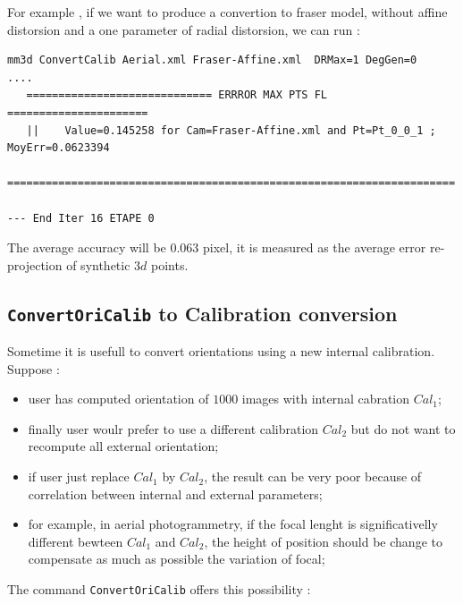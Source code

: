 For example , if we want to produce a convertion to fraser model, without affine distorsion and a one parameter of radial
distorsion, we can run :

\begin{verbatim}
mm3d ConvertCalib Aerial.xml Fraser-Affine.xml  DRMax=1 DegGen=0
....
   ============================= ERRROR MAX PTS FL ======================
   ||    Value=0.145258 for Cam=Fraser-Affine.xml and Pt=Pt_0_0_1 ; MoyErr=0.0623394
   ======================================================================

--- End Iter 16 ETAPE 0

\end{verbatim}


The average accuracy will be $0.063$ pixel, it is measured as the average error re-projection of  synthetic $3d$ points.


\subsection{{\tt ConvertOriCalib} to Calibration conversion}

Sometime it is usefull to convert orientations  using a new internal
calibration. Suppose :

\begin{itemize}
   \item user  has computed orientation of $1000$ images with internal cabration $Cal_1$;

   \item finally user woulr prefer to use   a different calibration  $Cal_2$ but do not want to
         recompute all external orientation;

   \item if user just replace  $Cal_1$ by $Cal_2$, the result can be very poor because of correlation
         between internal and external parameters; 

   \item for example, in aerial photogrammetry, if the 
         focal lenght is significativelly different bewteen $Cal_1$ and $Cal_2$,
         the height of position should be change to compensate as much as possible the
         variation of focal;

\end{itemize}

The command {\tt ConvertOriCalib} offers this possibility :

